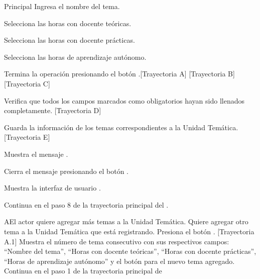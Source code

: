 \begin{UCtrayectoria}{Principal}
    \UCpaso[\UCactor] Ingresa el nombre del tema.
    
    \UCpaso[\UCactor] Selecciona las horas con docente teóricas.
    
    \UCpaso[\UCactor] Selecciona las horas con docente prácticas.
    
    \UCpaso[\UCactor] Selecciona las horas de aprendizaje autónomo.
    
    \UCpaso[\UCactor] Termina la operación presionando el botón .[Trayectoria A] [Trayectoria B] [Trayectoria C]
    
    \UCpaso Verifica que todos los campos marcados como obligatorios hayan sido llenados completamente. [Trayectoria D]
    
    \UCpaso Guarda la información de los temas correspondientes a la Unidad Temática. [Trayectoria E]
    
    \UCpaso Muestra el mensaje .
    
    \UCpaso[\UCactor] Cierra el mensaje presionando el botón .
    
    \UCpaso Muestra la interfaz de usuario .
    
    \UCpaso Continua en el paso 8 de la trayectoria principal del .

\end{UCtrayectoria}


\begin{UCtrayectoriaA}{A}{El actor quiere agregar más temas a la Unidad Temática.}
    \UCpaso[\UCactor] Quiere agregar otro tema a la Unidad Temática que está registrando.
    \UCpaso[\UCactor] Presiona el botón . [Trayectoria A.1]
    \UCpaso Muestra el número de tema consecutivo con sus respectivos campos: ``Nombre del tema'', ``Horas con docente teóricas'', ``Horas con docente prácticas'', ``Horas de aprendizaje autónomo'' y el botón  para el nuevo tema agregado.
    \UCpaso Continua en el paso 1 de la trayectoria principal de 
\end{UCtrayectoriaA}


